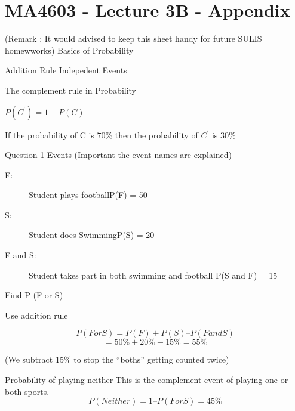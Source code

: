 \documentclass[]{report}
\begin{document}
\section*{MA4603 - Lecture 3B - Appendix}
(Remark : It would advised to keep this sheet handy for future SULIS homewworks)
Basics of Probability


Addition Rule
Indepedent Events

The complement rule in Probability


$P(C^{\prime}) = 1- P(C)$




If the probability of C is $70 \%$ then the probability of $C^{\prime}$ is $30\%$







Question 1
Events  (Important the event names are explained)

\begin{description}
\item[F:] Student plays footballP(F) = 50%
\item[S:] Student does SwimmingP(S) = 20%
\item[F and S:]            Student takes part in both swimming and football  
P(S and F) = 15%
\end{description}
Find P (F or S)

Use addition rule

\[P (F or S)  =  P(F) + P(S) – P( Fand S)\]
\[=  50\% + 20 \% - 15\% =    55\%\]


(We subtract 15\% to stop the “boths” getting counted twice)

Probability of playing neither
This is the complement event of playing one or both sports.
\[P(Neither) = 1 –  P( F or S)  = 45\%\]
\end{document}
